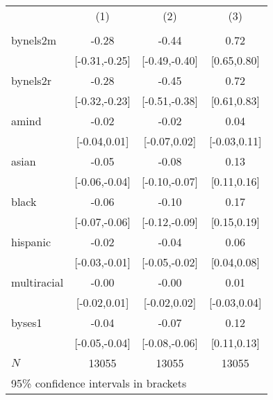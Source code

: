 \begin{tabular}{l*{3}{c}} \hline\hline
            &\multicolumn{1}{c}{(1)}&\multicolumn{1}{c}{(2)}&\multicolumn{1}{c}{(3)}\\
            &\multicolumn{1}{c}{}  &\multicolumn{1}{c}{}  &\multicolumn{1}{c}{}  \\
\hline
bynels2m    &                 -0.28&                 -0.44&                  0.72\\
            &         [-0.31,-0.25]&         [-0.49,-0.40]&           [0.65,0.80]\\
[1em]
bynels2r    &                 -0.28&                 -0.45&                  0.72\\
            &         [-0.32,-0.23]&         [-0.51,-0.38]&           [0.61,0.83]\\
[1em]
amind       &                 -0.02&                 -0.02&                  0.04\\
            &          [-0.04,0.01]&          [-0.07,0.02]&          [-0.03,0.11]\\
[1em]
asian       &                 -0.05&                 -0.08&                  0.13\\
            &         [-0.06,-0.04]&         [-0.10,-0.07]&           [0.11,0.16]\\
[1em]
black       &                 -0.06&                 -0.10&                  0.17\\
            &         [-0.07,-0.06]&         [-0.12,-0.09]&           [0.15,0.19]\\
[1em]
hispanic    &                 -0.02&                 -0.04&                  0.06\\
            &         [-0.03,-0.01]&         [-0.05,-0.02]&           [0.04,0.08]\\
[1em]
multiracial &                 -0.00&                 -0.00&                  0.01\\
            &          [-0.02,0.01]&          [-0.02,0.02]&          [-0.03,0.04]\\
[1em]
byses1      &                 -0.04&                 -0.07&                  0.12\\
            &         [-0.05,-0.04]&         [-0.08,-0.06]&           [0.11,0.13]\\
\hline
\(N\)       &                 13055&                 13055&                 13055\\
\hline\hline
\multicolumn{4}{l}{\footnotesize 95\% confidence intervals in brackets}\\
\end{tabular}
